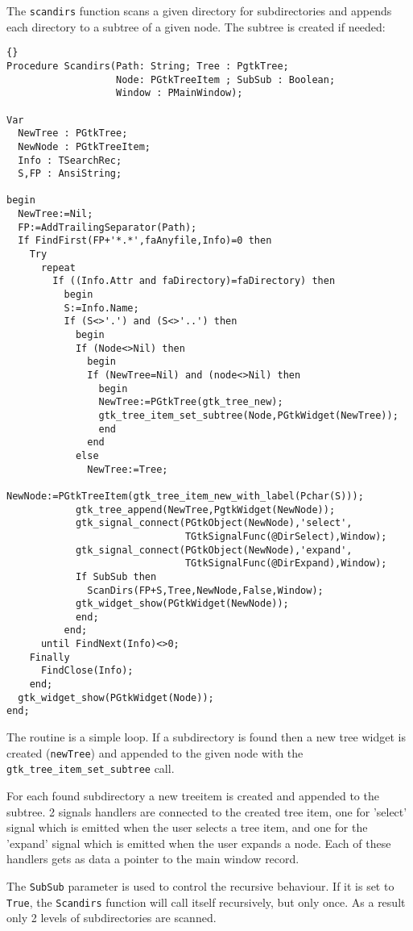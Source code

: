 \documentclass[10pt]{article}
\begin{document}
The \lstinline|scandirs| function scans a given directory for subdirectories
and appends each directory to a subtree of a given node. The subtree is
created if needed:
\begin{lstlisting}{}
Procedure Scandirs(Path: String; Tree : PgtkTree;
                   Node: PGtkTreeItem ; SubSub : Boolean;
                   Window : PMainWindow);

Var
  NewTree : PGtkTree;
  NewNode : PGtkTreeItem;
  Info : TSearchRec;
  S,FP : AnsiString;

begin
  NewTree:=Nil;
  FP:=AddTrailingSeparator(Path);
  If FindFirst(FP+'*.*',faAnyfile,Info)=0 then
    Try 
      repeat
        If ((Info.Attr and faDirectory)=faDirectory) then
          begin
          S:=Info.Name;
          If (S<>'.') and (S<>'..') then
            begin
            If (Node<>Nil) then
              begin
              If (NewTree=Nil) and (node<>Nil) then
                begin
                NewTree:=PGtkTree(gtk_tree_new);
                gtk_tree_item_set_subtree(Node,PGtkWidget(NewTree));
                end
              end
            else
              NewTree:=Tree;                
            NewNode:=PGtkTreeItem(gtk_tree_item_new_with_label(Pchar(S)));
            gtk_tree_append(NewTree,PgtkWidget(NewNode));
            gtk_signal_connect(PGtkObject(NewNode),'select',
                               TGtkSignalFunc(@DirSelect),Window);
            gtk_signal_connect(PGtkObject(NewNode),'expand',
                               TGtkSignalFunc(@DirExpand),Window);
            If SubSub then 
              ScanDirs(FP+S,Tree,NewNode,False,Window);
            gtk_widget_show(PGtkWidget(NewNode));
            end;
          end;  
      until FindNext(Info)<>0;
    Finally 
      FindClose(Info);
    end;
  gtk_widget_show(PGtkWidget(Node));
end;    
\end{lstlisting}
The routine is a simple loop. If a subdirectory is found then a new 
tree widget is created (\lstinline|newTree|) and appended to the 
given node with the \lstinline|gtk_tree_item_set_subtree| call.

For each found subdirectory a new treeitem is created and appended to 
the subtree. 2 signals handlers are connected to the created tree item,
one for 'select' signal which is emitted when the user selects a tree item, 
and one for the 'expand' signal which is emitted when the user expands a 
node. Each of these handlers gets as data a pointer to the main window
record.
 
The \lstinline|SubSub| parameter is used to control the recursive behaviour.
If it is set to \lstinline|True|, the \lstinline|Scandirs| function will
call itself recursively, but only once. As a result only 2 levels of
subdirectories are scanned. 
\end{document}
